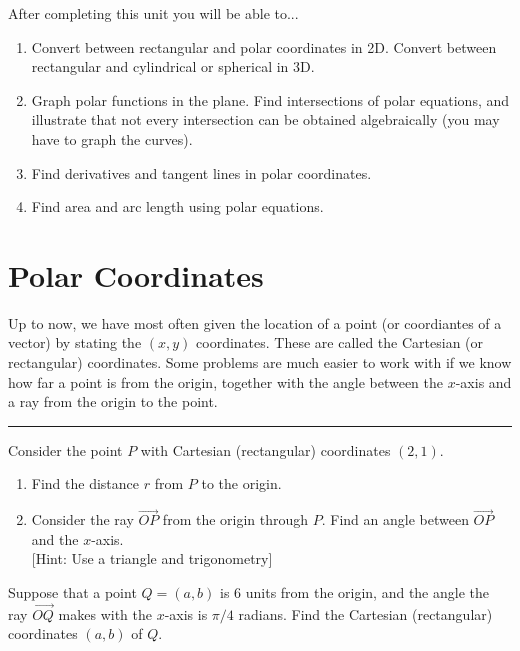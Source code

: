 
\noindent 
After completing this unit you will be able to...
\begin{enumerate}

\item Convert between rectangular and polar coordinates in 2D. Convert between rectangular and cylindrical or spherical in 3D.
\item Graph polar functions in the plane. Find intersections of polar equations, and illustrate that not every intersection can be obtained algebraically (you may have to graph the curves).
\item Find derivatives and tangent lines in polar coordinates.
\item Find area and arc length using polar equations.

\end{enumerate}

\newpage

\section{Polar Coordinates}
Up to now, we have most often given the location of a point (or coordiantes of a vector) by stating the $(x,y)$ coordinates.  These are called the Cartesian (or rectangular) coordinates.  Some problems are much easier to work with if we know how far a point is from the origin, together with the angle between the $x$-axis and a ray from the origin to the point.

\vskip0.2in

\hrule

\begin{problem}
%
Consider the point $P$ with Cartesian (rectangular) coordinates $(2,1)$.
\begin{enumerate}
\item Find the distance $r$ from $P$ to the origin. 
\item Consider the ray $\stackrel{\rightarrow}{OP}$ from the origin through $P$. Find an angle between $\vec{OP}$ and the $x$-axis.\\

[Hint: Use a triangle and trigonometry]
\end{enumerate}

\end{problem}
\begin{problem}
Suppose that a point $Q=(a,b)$ is 6 units from the origin, and the angle the ray $\vec{OQ}$ makes with the $x$-axis is $\pi/4$ radians.  Find the Cartesian (rectangular) coordinates $(a,b)$ of $Q$.
\end{problem}

